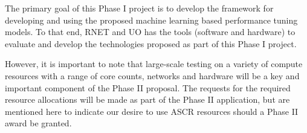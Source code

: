 The primary goal of this Phase I project is to develop the framework for developing and using the proposed machine learning based performance tuning models. 
To that end, RNET and UO has the tools (software and hardware) to evaluate and develop the technologies proposed as part of this Phase I project. 

However, it is important to note  that large-scale testing on a variety of compute resources with a range of core counts, networks and hardware will be a key and important component of the Phase II proposal. The requests for the required resource allocations will be made as part of the Phase II application, but are mentioned here to indicate our desire to use ASCR resources should a Phase II award be granted.  
